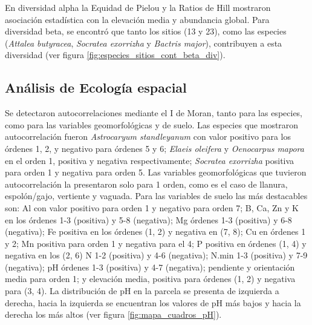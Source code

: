 \documentclass[11pt,]{article}
\begin{document}
En diversidad alpha la Equidad de Pielou y la Ratios de Hill mostraron
asociación estadística con la elevación media y abundancia global. Para
diversidad beta, se encontró que tanto los sitios (13 y 23), como las
especies (\emph{Attalea butyracea}, \emph{Socratea exorrizha} y
\emph{Bactris major}), contribuyen a esta diversidad (ver figura
\ref{fig:especies_sitios_cont_beta_div}).

\subsection{Análisis de Ecología
espacial}\label{anuxe1lisis-de-ecologuxeda-espacial-1}

Se detectaron autocorrelaciones mediante el I de Moran, tanto para las
especies, como para las variables geomorfológicas y de suelo. Las
especies que mostraron autocorrelación fueron \emph{Astrocaryum
standleyanum} con valor positivo para los órdenes 1, 2, y negativo para
órdenes 5 y 6; \emph{Elaeis oleifera} y \emph{Oenocarpus mapora} en el
orden 1, positiva y negativa respectivamente; \emph{Socratea exorrizha}
positiva para orden 1 y negativa para orden 5. Las variables
geomorfológicas que tuvieron autocorrelación la presentaron solo para 1
orden, como es el caso de llanura, espolón/gajo, vertiente y vaguada.
Para las variables de suelo las más destacables son: Al con valor
positivo para orden 1 y negativo para orden 7; B, Ca, Zn y K en los
órdenes 1-3 (positiva) y 5-8 (negativa); Mg órdenes 1-3 (positiva) y 6-8
(negativa); Fe positiva en los órdenes (1, 2) y negativa en (7, 8); Cu
en órdenes 1 y 2; Mn positiva para orden 1 y negativa para el 4; P
positiva en órdenes (1, 4) y negativa en los (2, 6) N 1-2 (positiva) y
4-6 (negativa); N.min 1-3 (positiva) y 7-9 (negativa); pH órdenes 1-3
(positiva) y 4-7 (negativa); pendiente y orientación media para orden 1;
y elevación media, positiva para órdenes (1, 2) y negativa para (3, 4).
La distribución de pH en la parcela se presenta de izquierda a derecha,
hacia la izquierda se encuentran los valores de pH más bajos y hacia la
derecha los más altos (ver figura \ref{fig:mapa_cuadros_pH}).
\end{document}
